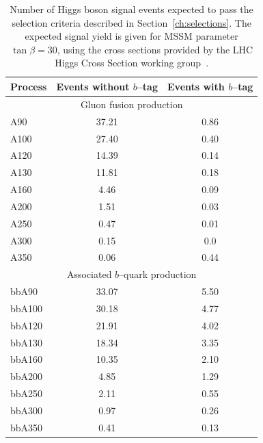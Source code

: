 \begin{table}[t]
\begin{center}
\begin{tabular}{|l|c|c|}
\hline
Process & Events without $b$--tag & Events with $b$--tag \\
\hline
\hline
\multicolumn{3}{|c|}{Gluon fusion production} \\
\hline
A90 & 37.21 & 0.86 \\
A100 & 27.40 & 0.40 \\
A120 & 14.39 & 0.14 \\
A130 & 11.81 & 0.18 \\
A160 & 4.46 & 0.09 \\
A200 & 1.51 & 0.03 \\
A250 & 0.47 & 0.01 \\
A300 & 0.15 & 0.0 \\
A350 & 0.06 & 0.44 \\
\hline
\multicolumn{3}{|c|}{Associated $b$--quark production} \\
\hline
bbA90 & 33.07 &  5.50 \\
bbA100 & 30.18 &  4.77 \\
bbA120 & 21.91 & 4.02 \\
bbA130 & 18.34 & 3.35 \\ 
bbA160 & 10.35 &  2.10 \\
bbA200 & 4.85  &  1.29 \\
bbA250 & 2.11 &  0.55 \\
bbA300 & 0.97 &  0.26 \\
bbA350 & 0.41 & 0.13 \\
\hline
\end{tabular}
\caption[Expected signal yields at \mbox{$\tan \beta = 30$}]{Number of Higgs
boson signal events expected to pass the selection criteria described in
Section~\ref{ch:selections}.  The expected signal yield is given for MSSM
parameter \mbox{$\tan \beta = 30$}, using the cross sections provided by the LHC
Higgs Cross Section working group~\cite{LHC-HCWG}.} \label{tab:SignalExpResultsLooseAHtoMuTau}
\end{center}
\end{table}

